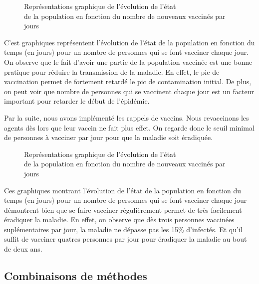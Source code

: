 \documentclass[a4paper, 12pt]{article}
\begin{document}
\begin{figure}[!h]
	\centering
	\qquad
	\centering
	\qquad
	\caption{Représentations graphique de l'évolution de l'état\\ de la population en fonction du nombre de nouveaux vaccinés par jours}

\end{figure}

C'est graphiques représentent l'évolution de l'état de la population en fonction du temps (en jours) pour un nombre de personnes qui se font vacciner chaque jour.
On observe que le fait d'avoir une partie de la population vaccinée est une bonne pratique pour réduire la transmission de la maladie. En effet, le pic de vaccination permet de
fortement retardé le pic de contamination initial.
\newpage
De plus, on peut voir que nombre de personnes qui se vaccinent chaque jour est un facteur important pour retarder le début de l'épidémie.

Par la suite, nous avons implémenté les rappels de vaccins. Nous revaccinons les agents dès lors que leur vaccin ne fait plus effet. On regarde donc le seuil minimal de personnes à vacciner par jour
pour que la maladie soit éradiquée.

\begin{figure}[!h]
	\centering
	\qquad
	\centering
	\qquad
	\caption{Représentations graphique de l'évolution de l'état\\ de la population en fonction du nombre de nouveaux vaccinés par jours}

\end{figure}

Ces graphiques montrant l'évolution de l'état de la population en fonction du temps (en jours) pour un nombre de personnes qui se font vacciner chaque jour démontrent bien que
se faire vacciner régulièrement permet de très facilement éradiquer la maladie. En effet, on observe que dès trois personnes vaccinées suplémentaires par jour, la maladie ne dépasse pas les 15\% d'infectés.
Et qu'il suffit de vacciner quatres personnes par jour pour éradiquer la maladie au bout de deux ans.

\subsection{Combinaisons de méthodes}
\end{document}

